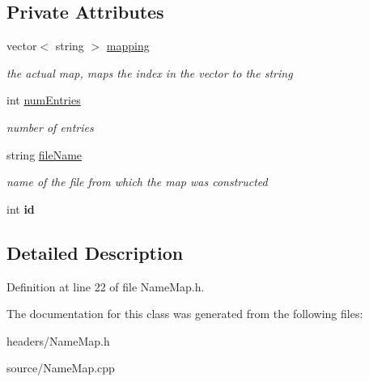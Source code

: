 \subsection*{Private Attributes}
\begin{DoxyCompactItemize}
\item 
\hypertarget{class_name_map_a1acb823b1c1fb7b8d43f7e0e1406dca8}{
vector$<$ string $>$ \hyperlink{class_name_map_a1acb823b1c1fb7b8d43f7e0e1406dca8}{mapping}}
\label{class_name_map_a1acb823b1c1fb7b8d43f7e0e1406dca8}

\begin{DoxyCompactList}\small\item\em the actual map, maps the index in the vector to the string \item\end{DoxyCompactList}\item 
\hypertarget{class_name_map_a647caae861e8a9e8472a033da6c0ad20}{
int \hyperlink{class_name_map_a647caae861e8a9e8472a033da6c0ad20}{numEntries}}
\label{class_name_map_a647caae861e8a9e8472a033da6c0ad20}

\begin{DoxyCompactList}\small\item\em number of entries \item\end{DoxyCompactList}\item 
\hypertarget{class_name_map_acf6827aa9176aa0820a2c7c0ec0cf3a4}{
string \hyperlink{class_name_map_acf6827aa9176aa0820a2c7c0ec0cf3a4}{fileName}}
\label{class_name_map_acf6827aa9176aa0820a2c7c0ec0cf3a4}

\begin{DoxyCompactList}\small\item\em name of the file from which the map was constructed \item\end{DoxyCompactList}\item 
\hypertarget{class_name_map_ab836a5099928fbf10c864504fd658fa8}{
int {\bfseries id}}
\label{class_name_map_ab836a5099928fbf10c864504fd658fa8}

\end{DoxyCompactItemize}


\subsection{Detailed Description}


Definition at line 22 of file NameMap.h.



The documentation for this class was generated from the following files:\begin{DoxyCompactItemize}
\item 
headers/NameMap.h\item 
source/NameMap.cpp\end{DoxyCompactItemize}

